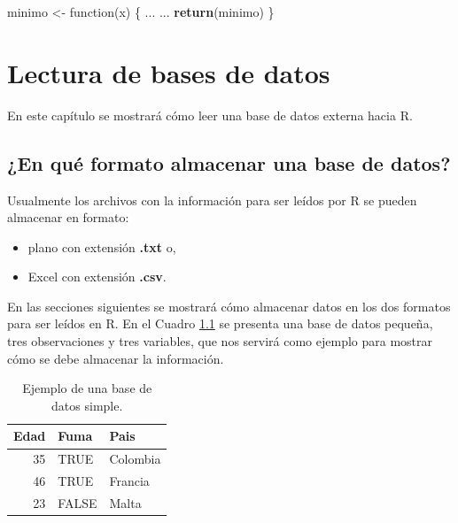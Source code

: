 \documentclass[10pt,]{krantz}
\makeatletter
\newenvironment{Shaded}{\begin{snugshade}}{\end{snugshade}}
\newcommand{\KeywordTok}[1]{\textcolor[rgb]{0.13,0.29,0.53}{\textbf{{#1}}}}
\newcommand{\StringTok}[1]{\textcolor[rgb]{0.31,0.60,0.02}{{#1}}}
\newcommand{\NormalTok}[1]{{#1}}
\providecommand{\tightlist}{%
  \setlength{\itemsep}{0pt}\setlength{\parskip}{0pt}}
\let\proglang=\textsf
\newenvironment{kframe}{%
\medskip{}
\setlength{\fboxsep}{.8em}
 \def\at@end@of@kframe{}%
 \ifinner\ifhmode%
  \def\at@end@of@kframe{\end{minipage}}%
  \begin{minipage}{\columnwidth}%
 \fi\fi%
 \def\FrameCommand##1{\hskip\@totalleftmargin \hskip-\fboxsep
 \colorbox{shadecolor}{##1}\hskip-\fboxsep
     \hskip-\linewidth \hskip-\@totalleftmargin \hskip\columnwidth}%
 \MakeFramed {\advance\hsize-\width
   \@totalleftmargin\z@ \linewidth\hsize
   \@setminipage}}%
 {\par\unskip\endMakeFramed%
 \at@end@of@kframe}
\renewenvironment{Shaded}{\begin{kframe}}{\end{kframe}}
\makeatother
\begin{document}
\begin{Shaded}
\begin{Highlighting}[]
\NormalTok{minimo <-}\StringTok{ }\NormalTok{function(x) \{}
  \NormalTok{...}
  \NormalTok{...}
  \KeywordTok{return}\NormalTok{(minimo)}
\NormalTok{\}}
\end{Highlighting}
\end{Shaded}

\chapter{\texorpdfstring{Lectura de bases de datos
\label{read}}{Lectura de bases de datos  }}\label{lectura-de-bases-de-datos}

En este capítulo se mostrará cómo leer una base de datos externa hacia
\proglang{R}.

\section{\texorpdfstring{¿En qué formato almacenar una base de datos?
}{¿En qué formato almacenar una base de datos?  }}\label{en-que-formato-almacenar-una-base-de-datos}

Usualmente los archivos con la información para ser leídos por
\proglang{R} se pueden almacenar en formato:

\begin{itemize}
\tightlist
\item
  plano con extensión \textbf{.txt} o,
\item
  Excel con extensión \textbf{.csv}.
\end{itemize}

En las secciones siguientes se mostrará cómo almacenar datos en los dos
formatos para ser leídos en \proglang{R}. En el Cuadro \ref{tab:dt1} se
presenta una base de datos pequeña, tres observaciones y tres variables,
que nos servirá como ejemplo para mostrar cómo se debe almacenar la
información.

\begin{table}

\caption{\label{tab:dt1}Ejemplo de una base de datos simple.}
\centering
\begin{tabular}[t]{rll}
\toprule
Edad & Fuma & Pais\\
\midrule
35 & TRUE & Colombia\\
46 & TRUE & Francia\\
23 & FALSE & Malta\\
\bottomrule
\end{tabular}
\end{table}
\end{document}
